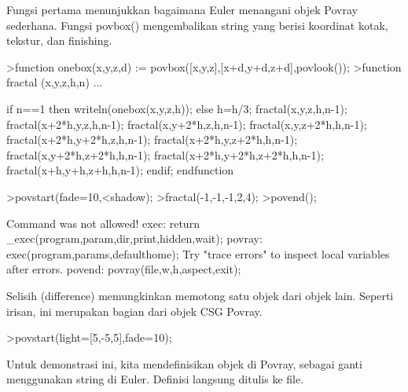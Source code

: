 \documentclass[a4paper,10pt]{article}
\begin{document}
\begin{eulernotebook}
\begin{eulercomment}
Fungsi pertama menunjukkan bagaimana Euler menangani objek Povray sederhana. Fungsi povbox() mengembalikan string
yang berisi koordinat kotak, tekstur, dan finishing.
\end{eulercomment}
\begin{eulerprompt}
>function onebox(x,y,z,d) := povbox([x,y,z],[x+d,y+d,z+d],povlook());
>function fractal (x,y,z,h,n) ...
\end{eulerprompt}
\begin{eulerudf}
   if n==1 then writeln(onebox(x,y,z,h));
   else
     h=h/3;
     fractal(x,y,z,h,n-1);
     fractal(x+2*h,y,z,h,n-1);
     fractal(x,y+2*h,z,h,n-1);
     fractal(x,y,z+2*h,h,n-1);
     fractal(x+2*h,y+2*h,z,h,n-1);
     fractal(x+2*h,y,z+2*h,h,n-1);
     fractal(x,y+2*h,z+2*h,h,n-1);
     fractal(x+2*h,y+2*h,z+2*h,h,n-1);
     fractal(x+h,y+h,z+h,h,n-1);
   endif;
  endfunction
\end{eulerudf}
\begin{eulerprompt}
>povstart(fade=10,<shadow);
>fractal(-1,-1,-1,2,4);
>povend();
\end{eulerprompt}
\begin{euleroutput}
  Command was not allowed!
  exec:
      return _exec(program,param,dir,print,hidden,wait);
  povray:
      exec(program,params,defaulthome);
  Try "trace errors" to inspect local variables after errors.
  povend:
      povray(file,w,h,aspect,exit); 
\end{euleroutput}
\begin{eulercomment}
Selisih (difference) memungkinkan memotong satu objek dari objek lain. Seperti irisan, ini merupakan bagian dari
objek CSG Povray.
\end{eulercomment}
\begin{eulerprompt}
>povstart(light=[5,-5,5],fade=10);
\end{eulerprompt}
\begin{eulercomment}
Untuk demonstrasi ini, kita mendefinisikan objek di Povray, sebagai ganti menggunakan string di Euler. Definisi
langsung ditulis ke file.


\end{eulercomment}
\end{eulernotebook}
\end{document}
